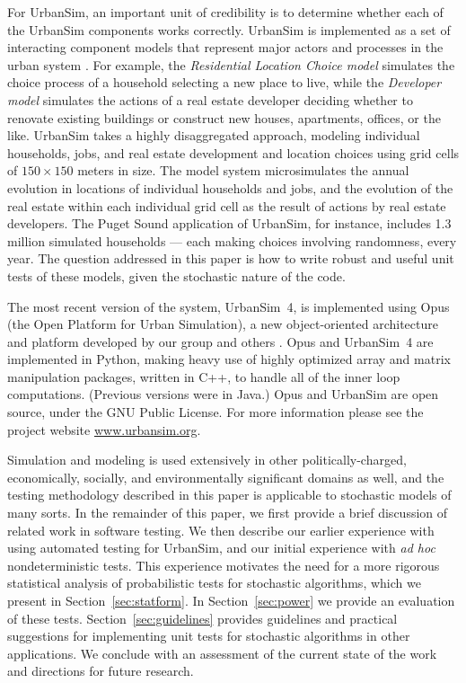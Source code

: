 For UrbanSim, an important unit of credibility is to determine whether each
of the UrbanSim components works correctly.  UrbanSim is implemented as a
set of interacting component models that represent major actors and
processes in the urban system \cite{noth-ceus-2003}.  For example, the
\emph{Residential Location Choice model} simulates the choice process of a
household selecting a new place to live, while the \emph{Developer model}
simulates the actions of a real estate developer deciding whether to
renovate existing buildings or construct new houses, apartments, offices,
or the like.  UrbanSim takes a highly disaggregated approach, modeling
individual households, jobs, and real estate development and location
choices using grid cells of $150\times 150$ meters in size.  The model
system microsimulates the annual evolution in locations of individual
households and jobs, and the evolution of the real estate within each
individual grid cell as the result of actions by real estate developers.
The Puget Sound application of UrbanSim, for instance, includes 1.3 million
simulated households --- each making choices involving randomness, every
year.  The question addressed in this paper is how to write robust and
useful unit tests of these models, given the stochastic nature of the code.

The most recent version of the system, UrbanSim~4, is implemented using
Opus (the Open Platform for Urban Simulation), a new object-oriented
architecture and platform developed by our group and others
\cite{waddell-opus-2005}.  Opus and UrbanSim~4 are implemented in Python,
making heavy use of highly optimized array and matrix manipulation
packages, written in C++, to handle all of the inner loop computations.
(Previous versions were in Java.)  Opus and UrbanSim are open source, under
the GNU Public License.  For more information please see the project
website \url{www.urbansim.org}.

Simulation and modeling is used extensively in other politically-charged,
economically, socially, and environmentally significant domains as well,
and the testing methodology described in this paper is applicable to
stochastic models of many sorts.  In the remainder of this paper, we first
provide a brief discussion of related work in software testing.  We then
describe our earlier experience with using automated testing for UrbanSim,
and our initial experience with \emph{ad hoc} nondeterministic tests.  This
experience motivates the need for a more rigorous statistical analysis of
probabilistic tests for stochastic algorithms, which we present in
Section~\ref{sec:statform}.  In Section~\ref{sec:power} we provide an
evaluation of these tests.  Section~\ref{sec:guidelines} provides
guidelines and practical suggestions for implementing unit tests for
stochastic algorithms in other applications.  We conclude with an
assessment of the current state of the work and directions for future
research.


